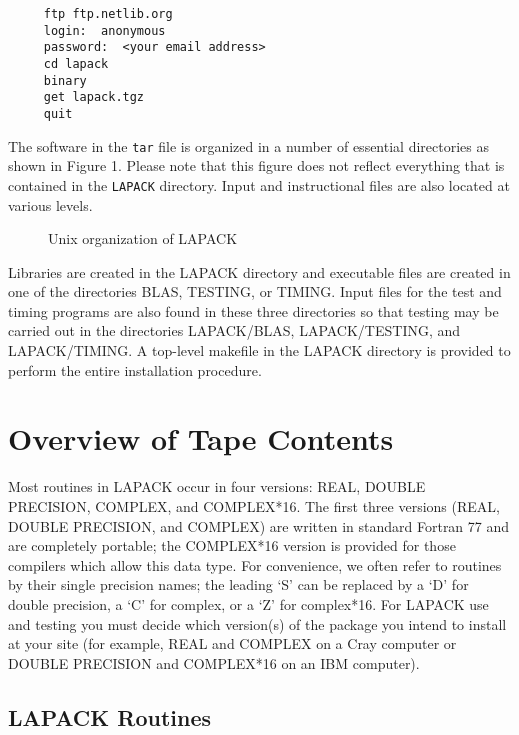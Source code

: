 \begin{verbatim}
     ftp ftp.netlib.org
     login:  anonymous
     password:  <your email address>
     cd lapack
     binary
     get lapack.tgz
     quit
\end{verbatim}

The software in the {\tt tar} file
is organized in a number of essential directories as shown
in Figure 1.  Please note that this figure does not reflect everything
that is contained in the {\tt LAPACK} directory.  Input and instructional
files are also located at various levels.
\begin{figure}
\vspace{11pt}
\centerline{}
\caption{Unix organization of LAPACK}
\vspace{11pt}
\end{figure}
Libraries are created in the LAPACK directory and 
executable files are created in one of the directories BLAS, TESTING,
or TIMING.  Input files for the test and timing programs are also
found in these three directories so that testing may be carried out
in the directories LAPACK/BLAS, LAPACK/TESTING, and LAPACK/TIMING.
A top-level makefile in the LAPACK directory is provided to perform the 
entire installation procedure.

\section{Overview of Tape Contents}\label{overview}

\dent
Most routines in LAPACK occur in four versions: REAL,
DOUBLE PRECISION, COMPLEX, and COMPLEX*16.
The first three versions (REAL, DOUBLE PRECISION, and COMPLEX)
are written in standard Fortran 77 and are completely portable;
the COMPLEX*16 version is provided for
those compilers which allow this data type.  
For convenience, we often refer to routines by their single precision
names; the leading `S' can be replaced by a `D' for double precision,
a `C' for complex, or a `Z' for complex*16.  
For LAPACK use and testing you must decide which version(s)
of the package you intend to install at your site (for example,
REAL and COMPLEX on a Cray computer or DOUBLE PRECISION and
COMPLEX*16 on an IBM computer).

\subsection{LAPACK Routines}


